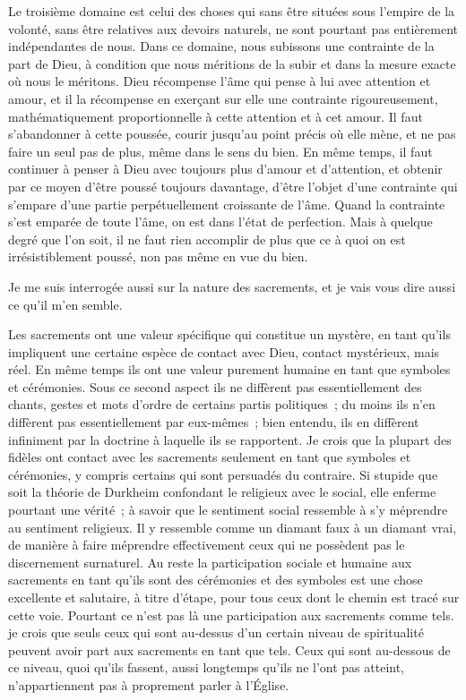 \documentclass[french,twoside]{book} %
\begin{document}
Le troisième domaine est celui des choses qui sans être situées sous l'empire de la volonté, sans être relatives aux devoirs naturels, ne sont pourtant pas entièrement indépendantes de nous. Dans ce domaine, nous subissons une contrainte de la part de Dieu, à condition que nous méritions de la subir et dans la mesure exacte où nous le méritons. Dieu récompense l'âme qui pense à lui avec attention et amour, et il la récompense en exerçant sur elle une contrainte rigoureusement, mathématiquement proportionnelle à cette attention et à cet amour. Il faut s'abandonner à cette poussée, courir jusqu'au point précis où elle mène, et ne pas faire un seul pas de plus, même dans le sens du bien. En même temps, il faut continuer à penser à Dieu avec toujours plus d'amour et d'attention, et obtenir par ce moyen d'être poussé toujours davantage, d'être l'objet d'une contrainte qui s'empare d'une partie perpétuellement croissante de l'âme. Quand la contrainte s'est emparée de toute l'âme, on est dans l'état de perfection. Mais à quelque degré que l'on soit, il ne faut rien accomplir de plus que ce à quoi on est irrésistiblement poussé, non pas même en vue du bien.\par
Je me suis interrogée aussi sur la nature des sacrements, et je vais vous dire aussi ce qu'il m'en semble.\par
Les sacrements ont une valeur spécifique qui constitue un mystère, en tant qu'ils impliquent une certaine espèce de contact avec Dieu, contact mystérieux, mais réel. En même temps ils ont une valeur purement humaine en tant que symboles et cérémonies. Sous ce second aspect ils ne diffèrent pas essentiellement des chants, gestes et mots d'ordre de certains partis politiques ; du moins ils n'en diffèrent pas essentiellement par eux-mêmes ; bien entendu, ils en diffèrent infiniment par la doctrine à laquelle ils se rapportent. Je crois que la plupart des fidèles ont contact avec les sacrements seulement en tant que symboles et cérémonies, y compris certains qui sont persuadés du contraire. Si stupide que soit la théorie de Durkheim confondant le religieux avec le social, elle enferme pourtant une vérité ; à savoir que le sentiment social ressemble à s'y méprendre au sentiment religieux. Il y ressemble comme un diamant faux à un diamant vrai, de manière à faire méprendre effectivement ceux qui ne possèdent pas le discernement surnaturel. Au reste la participation sociale et humaine aux sacrements en tant qu'ils sont des cérémonies et des symboles est une chose excellente et salutaire, à titre d'étape, pour tous ceux dont le chemin est tracé sur cette voie. Pourtant ce n'est pas là une participation aux sacrements comme tels. je crois que seuls ceux qui sont au-dessus d'un certain niveau de spiritualité peuvent avoir part aux sacrements en tant que tels. Ceux qui sont au-dessous de ce niveau, quoi qu'ils fassent, aussi longtemps qu'ils ne l'ont pas atteint, n'appartiennent pas à proprement parler à l'Église.\par
\end{document}
